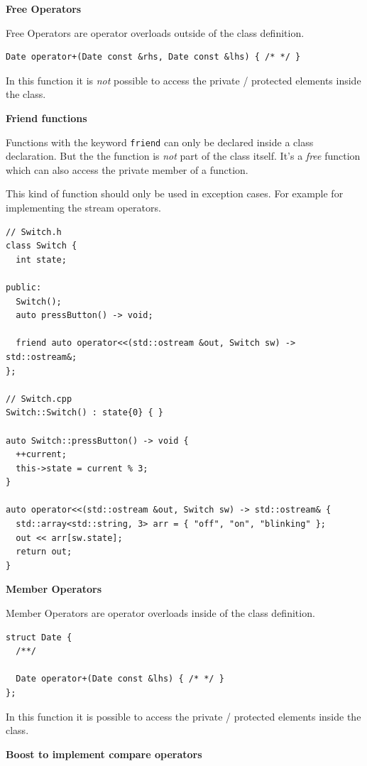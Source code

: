\documentclass[11pt,twoside,landscape]{article}
\begin{document}
\begin{multicols}{3}
\textbf{Free Operators}

Free Operators are operator overloads outside of the class definition.
\lstset{language=c++,label= ,caption= ,captionpos=b,numbers=none}
\begin{lstlisting}
Date operator+(Date const &rhs, Date const &lhs) { /* */ }
\end{lstlisting}

In this function it is \emph{not} possible to access the private / protected elements inside the class.

\textbf{Friend functions}

Functions with the keyword \texttt{friend} can only be declared inside a class declaration.
But the the function is \emph{not} part of the class itself.
It's a \emph{free} function which can also access the private member of a function.

This kind of function should only be used in exception cases.
For example for implementing the stream operators.

\lstset{language=c++,label= ,caption= ,captionpos=b,numbers=none}
\begin{lstlisting}
// Switch.h
class Switch {
  int state;

public:
  Switch();
  auto pressButton() -> void;

  friend auto operator<<(std::ostream &out, Switch sw) -> std::ostream&;
};

// Switch.cpp
Switch::Switch() : state{0} { }

auto Switch::pressButton() -> void {
  ++current;
  this->state = current % 3;
}

auto operator<<(std::ostream &out, Switch sw) -> std::ostream& {
  std::array<std::string, 3> arr = { "off", "on", "blinking" };
  out << arr[sw.state];
  return out;
}

\end{lstlisting}

\textbf{Member Operators}

Member Operators are operator overloads inside of the class definition.
\lstset{language=c++,label= ,caption= ,captionpos=b,numbers=none}
\begin{lstlisting}
struct Date {
  /**/

  Date operator+(Date const &lhs) { /* */ }
};
\end{lstlisting}

In this function it is possible to access the private / protected elements inside the class.


\textbf{Boost to implement compare operators}


\end{multicols}
\end{document}
